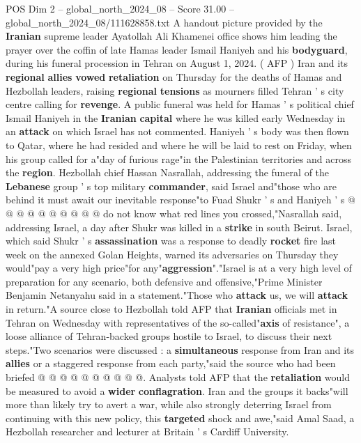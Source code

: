 \begin{textsample}{POS Dim 2 – global\_north\_2024\_08 – Score 31.00 – global\_north\_2024\_08/111628858.txt}  \label{ex:f2_pos_083}
A handout picture provided by the \textbf{Iranian} supreme leader Ayatollah Ali Khamenei office shows him leading the prayer over the coffin of late Hamas leader Ismail Haniyeh and his \textbf{bodyguard}, during his funeral procession in Tehran on August 1, 2024. ( AFP ) Iran and its \textbf{regional} \textbf{allies} \textbf{vowed} \textbf{retaliation} on Thursday for the deaths of Hamas and Hezbollah leaders, raising \textbf{regional} \textbf{tensions} as mourners filled Tehran ' s city centre calling for \textbf{revenge}.
A public funeral was held for Hamas ' s political chief Ismail Haniyeh in the \textbf{Iranian} \textbf{capital} where he was killed early Wednesday in an \textbf{attack} on which Israel has not commented.
Haniyeh ' s body was then flown to Qatar, where he had resided and where he will be laid to rest on Friday, when his group called for a"day of furious rage"in the Palestinian territories and across the \textbf{region}.
Hezbollah chief Hassan Nasrallah, addressing the funeral of the \textbf{Lebanese} group ' s top military \textbf{commander}, said Israel and"those who are behind it must await our inevitable response"to Fuad Shukr ' s and Haniyeh ' s @ @ @ @ @ @ @ @ @ @ do not know what red lines you crossed,"Nasrallah said, addressing Israel, a day after Shukr was killed in a \textbf{strike} in south Beirut.
Israel, which said Shukr ' s \textbf{assassination} was a response to deadly \textbf{rocket} fire last week on the annexed Golan Heights, warned its adversaries on Thursday they would"pay a very high price"for any"\textbf{aggression}"."Israel is at a very high level of preparation for any scenario, both defensive and offensive,"Prime Minister Benjamin Netanyahu said in a statement."Those who \textbf{attack} us, we will \textbf{attack} in return."A source close to Hezbollah told AFP that \textbf{Iranian} officials met in Tehran on Wednesday with representatives of the so-called"\textbf{axis} of resistance", a loose alliance of Tehran-backed groups hostile to Israel, to discuss their next steps."Two scenarios were discussed : a \textbf{simultaneous} response from Iran and its \textbf{allies} or a staggered response from each party,"said the source who had been briefed @ @ @ @ @ @ @ @ @ @.
Analysts told AFP that the \textbf{retaliation} would be measured to avoid a \textbf{wider} \textbf{conflagration}.
Iran and the groups it backs"will more than likely try to avert a war, while also strongly deterring Israel from continuing with this new policy, this \textbf{targeted} shock and awe,"said Amal Saad, a Hezbollah researcher and lecturer at Britain ' s Cardiff University.

\end{textsample}
